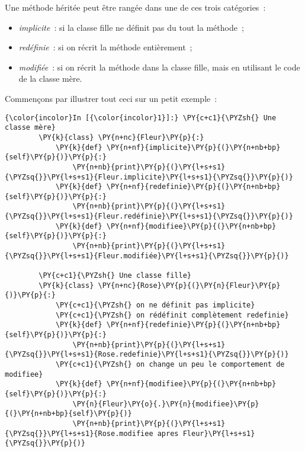     Une méthode héritée peut être rangée dans une de ces trois catégories~:

\begin{itemize}
\tightlist
\item
  \emph{implicite}~: si la classe fille ne définit pas du tout la
  méthode~;
\item
  \emph{redéfinie}~: si on récrit la méthode entièrement~;
\item
  \emph{modifiée}~: si on récrit la méthode dans la classe fille, mais
  en utilisant le code de la classe mère.
\end{itemize}

    Commençons par illustrer tout ceci sur un petit exemple~:

    \begin{Verbatim}[commandchars=\\\{\}]
{\color{incolor}In [{\color{incolor}1}]:} \PY{c+c1}{\PYZsh{} Une classe mère}
        \PY{k}{class} \PY{n+nc}{Fleur}\PY{p}{:}
            \PY{k}{def} \PY{n+nf}{implicite}\PY{p}{(}\PY{n+nb+bp}{self}\PY{p}{)}\PY{p}{:}
                \PY{n+nb}{print}\PY{p}{(}\PY{l+s+s1}{\PYZsq{}}\PY{l+s+s1}{Fleur.implicite}\PY{l+s+s1}{\PYZsq{}}\PY{p}{)}
            \PY{k}{def} \PY{n+nf}{redefinie}\PY{p}{(}\PY{n+nb+bp}{self}\PY{p}{)}\PY{p}{:}
                \PY{n+nb}{print}\PY{p}{(}\PY{l+s+s1}{\PYZsq{}}\PY{l+s+s1}{Fleur.redéfinie}\PY{l+s+s1}{\PYZsq{}}\PY{p}{)}
            \PY{k}{def} \PY{n+nf}{modifiee}\PY{p}{(}\PY{n+nb+bp}{self}\PY{p}{)}\PY{p}{:}
                \PY{n+nb}{print}\PY{p}{(}\PY{l+s+s1}{\PYZsq{}}\PY{l+s+s1}{Fleur.modifiée}\PY{l+s+s1}{\PYZsq{}}\PY{p}{)}
        
        \PY{c+c1}{\PYZsh{} Une classe fille}
        \PY{k}{class} \PY{n+nc}{Rose}\PY{p}{(}\PY{n}{Fleur}\PY{p}{)}\PY{p}{:}
            \PY{c+c1}{\PYZsh{} on ne définit pas implicite}
            \PY{c+c1}{\PYZsh{} on rédéfinit complètement redefinie}
            \PY{k}{def} \PY{n+nf}{redefinie}\PY{p}{(}\PY{n+nb+bp}{self}\PY{p}{)}\PY{p}{:}
                \PY{n+nb}{print}\PY{p}{(}\PY{l+s+s1}{\PYZsq{}}\PY{l+s+s1}{Rose.redefinie}\PY{l+s+s1}{\PYZsq{}}\PY{p}{)}
            \PY{c+c1}{\PYZsh{} on change un peu le comportement de modifiee}
            \PY{k}{def} \PY{n+nf}{modifiee}\PY{p}{(}\PY{n+nb+bp}{self}\PY{p}{)}\PY{p}{:}
                \PY{n}{Fleur}\PY{o}{.}\PY{n}{modifiee}\PY{p}{(}\PY{n+nb+bp}{self}\PY{p}{)}
                \PY{n+nb}{print}\PY{p}{(}\PY{l+s+s1}{\PYZsq{}}\PY{l+s+s1}{Rose.modifiee apres Fleur}\PY{l+s+s1}{\PYZsq{}}\PY{p}{)}
\end{Verbatim}


